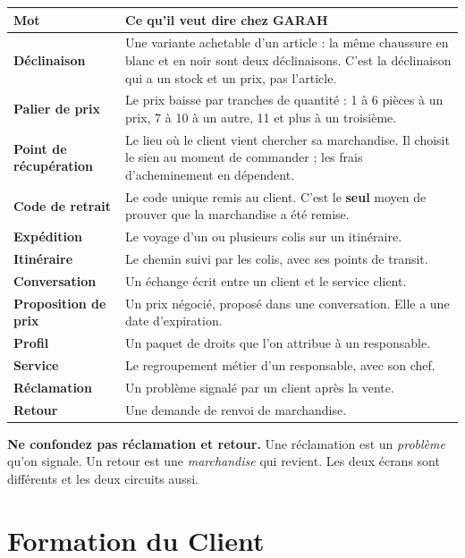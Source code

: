 \documentclass[11pt,a4paper]{report}
\begin{document}
\begin{longtable}{@{}>{\bfseries}p{3.6cm} p{11.2cm}@{}}
\toprule
Mot & Ce qu'il veut dire chez GARAH \\
\midrule
\endhead
Déclinaison
  & Une variante achetable d'un article : la même chaussure en blanc et en
    noir sont deux déclinaisons. C'est la déclinaison qui a un stock et un
    prix, pas l'article. \\[4pt]
Palier de prix
  & Le prix baisse par tranches de quantité : 1 à 6 pièces à un prix, 7 à 10 à
    un autre, 11 et plus à un troisième. \\[4pt]
Point de récupération
  & Le lieu où le client vient chercher sa marchandise. Il choisit le sien au
    moment de commander ; les frais d'acheminement en dépendent. \\[4pt]
Code de retrait
  & Le code unique remis au client. C'est le \textbf{seul} moyen de prouver que
    la marchandise a été remise. \\[4pt]
Expédition
  & Le voyage d'un ou plusieurs colis sur un itinéraire. \\[4pt]
Itinéraire
  & Le chemin suivi par les colis, avec ses points de transit. \\[4pt]
Conversation
  & Un échange écrit entre un client et le service client. \\[4pt]
Proposition de prix
  & Un prix négocié, proposé dans une conversation. Elle a une date
    d'expiration. \\[4pt]
Profil
  & Un paquet de droits que l'on attribue à un responsable. \\[4pt]
Service
  & Le regroupement métier d'un responsable, avec son chef. \\[4pt]
Réclamation
  & Un problème signalé par un client après la vente. \\[4pt]
Retour
  & Une demande de renvoi de marchandise. \\
\bottomrule
\end{longtable}

\begin{attention}
\textbf{Ne confondez pas réclamation et retour.} Une réclamation est un
\emph{problème} qu'on signale. Un retour est une \emph{marchandise} qui revient.
Les deux écrans sont différents et les deux circuits aussi.
\end{attention}

\chapter{Formation du Client}
\label{ch:client}
\end{document}
